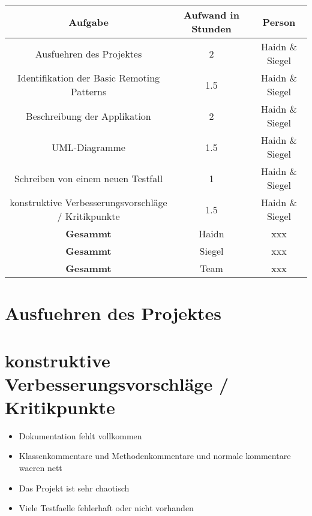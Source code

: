 \documentclass[a4paper]{article}
\begin{document}
\begin{center}
  \begin{tabular}{ | c | c | c | }
    \hline
\textbf{Aufgabe} & \textbf{Aufwand in Stunden} & \textbf{Person} \\ 
    \hline 
    \hline
	Ausfuehren des Projektes & 2 & Haidn \& Siegel \\ 
    \hline
	Identifikation der Basic Remoting Patterns & 1.5 & Haidn \& Siegel \\ 
    \hline
	Beschreibung der Applikation & 2 & Haidn \& Siegel \\ 
    \hline
	UML-Diagramme & 1.5 & Haidn \& Siegel \\ 
    \hline
	Schreiben von einem neuen Testfall & 1 & Haidn \& Siegel \\ 
    \hline
	konstruktive Verbesserungsvorschläge / Kritikpunkte & 1.5 & Haidn \& Siegel \\ 
    \hline
	 \hline
	 \textbf{Gesammt} & Haidn & xxx \\ 
	 \hline
	 \textbf{Gesammt} & Siegel & xxx\\ 
	 \hline
	 \textbf{Gesammt} & Team & xxx \\ 
  \end{tabular}
\end{center}
\newpage
\section{Ausfuehren des Projektes}	
	
\section{konstruktive Verbesserungsvorschläge / Kritikpunkte}	
\begin{itemize}
\item Dokumentation fehlt vollkommen
\item Klassenkommentare und Methodenkommentare und normale kommentare waeren nett
\item Das Projekt ist sehr chaotisch
\item Viele Testfaelle fehlerhaft oder nicht vorhanden

\end{itemize}
\end{document}
